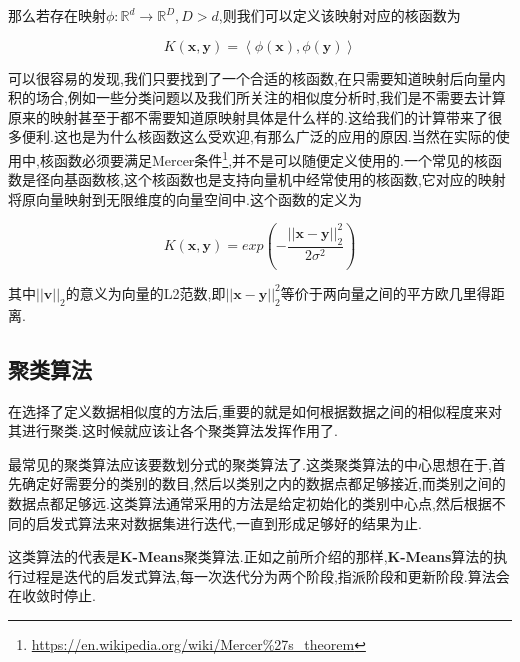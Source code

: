那么若存在映射$\phi: \mathbb{R}^d \rightarrow \mathbb{R}^D, D>d$,则我们可以定义该映射对应的核函数为

\begin{equation}
	K(\mathbf{x}, \mathbf{y}) = \left<\phi(\mathbf{x}), \phi(\mathbf{y})\right>
\end{equation}

可以很容易的发现,我们只要找到了一个合适的核函数,在只需要知道映射后向量内积的场合,例如一些分类问题以及我们所关注的相似度分析时,我们是不需要去计算原来的映射甚至于都不需要知道原映射具体是什么样的.这给我们的计算带来了很多便利.这也是为什么核函数这么受欢迎,有那么广泛的应用的原因.当然在实际的使用中,核函数必须要满足Mercer条件\footnote{\url{https://en.wikipedia.org/wiki/Mercer\%27s_theorem}},并不是可以随便定义使用的.一个常见的核函数是径向基函数核,这个核函数也是支持向量机中经常使用的核函数,它对应的映射将原向量映射到无限维度的向量空间中.这个函数的定义为

\begin{equation}
	K(\mathbf{x},\mathbf{y}) = exp\left(-\frac{||\mathbf{x}-\mathbf{y}||^2_2}{2\sigma^2}\right)
\end{equation}

其中$||\mathbf{v}||_2$的意义为向量的L2范数,即$||\mathbf{x} - \mathbf{y}||^2_2$等价于两向量之间的平方欧几里得距离.


\subsection{聚类算法}

在选择了定义数据相似度的方法后,重要的就是如何根据数据之间的相似程度来对其进行聚类.这时候就应该让各个聚类算法发挥作用了.

最常见的聚类算法应该要数划分式的聚类算法了.这类聚类算法的中心思想在于,首先确定好需要分的类别的数目,然后以类别之内的数据点都足够接近,而类别之间的数据点都足够远.这类算法通常采用的方法是给定初始化的类别中心点,然后根据不同的启发式算法来对数据集进行迭代,一直到形成足够好的结果为止.

这类算法的代表是\textbf{K-Means}聚类算法.正如之前所介绍的那样,\textbf{K-Means}算法的执行过程是迭代的启发式算法,每一次迭代分为两个阶段,指派阶段和更新阶段.算法会在收敛时停止.

